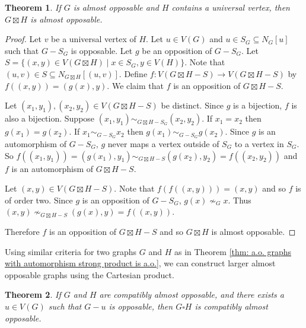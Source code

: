 \documentclass[11pt]{article}
\newtheorem{theorem}{Theorem}[section]
\theoremstyle{definition}
\begin{document}
\begin{theorem}
    \label{thm: a.o. strong product uni. vertex is a.o.}
    If $G$ is almost opposable and $H$ contains a universal vertex, then
    $G\boxtimes H$ is almost opposable. 
\end{theorem}

\begin{proof}
    Let $v$ be a universal vertex of $H$. Let $u\in V(G)$ and $u\in S_G
    \subseteq N_G[u]$ such that $G-S_G$ is opposable. Let $g$ be an opposition
    of $G-S_G$. Let $S = \{ (x,y)\in V(G\boxtimes H) \mid x\in S_G, y\in
    V(H)\}$. Note that $(u,v) \in S\subseteq N_{G\boxtimes H}[(u,v)]$. Define
    $f: V(G\boxtimes H - S) \to V(G\boxtimes H - S)$ by $f((x,y)) = (g(x), y)$.
    We claim that $f$ is an opposition of $G\boxtimes H - S$. 

    Let $(x_1, y_1), (x_2, y_2) \in V(G\boxtimes H - S)$ be distinct. Since $g$
    is a bijection, $f$ is also a bijection. Suppose $(x_1, y_1)
    \sim_{G\boxtimes H - S_G} (x_2, y_2)$. If $x_1 = x_2$ then $g(x_1) =
    g(x_2)$. If $x_1 \sim_{G - S_G} x_2$ then $g(x_1) \sim _{G - S_G} g(x_2)$.
    Since $g$ is an automorphism of $G- S_G$, $g$ never maps a vertex outside
    of $S_G$ to a vertex in $S_G$. So $f((x_1,y_1)) = (g(x_1), y_1)
    \sim_{G\boxtimes H - S} (g(x_2), y_2) = f((x_2, y_2))$ and $f$ is an
    automorphism of $G\boxtimes H - S$.

    Let $(x,y) \in V(G\boxtimes H - S)$. Note that $f(f((x,y))) = (x,y)$ and so
    $f$ is of order two. Since $g$ is an opposition of $G-S_G$, $g(x) \nsim_G
    x$. Thus $(x,y) \nsim_{G\boxtimes H - S} (g(x), y) = f((x,y))$. 

    Therefore $f$ is an opposition of $G\boxtimes H - S$ and so $G\boxtimes H$
    is almost opposable. 
\end{proof}

Using similar criteria for two graphs $G$ and $H$ as in Theorem \ref{thm: a.o.
graphs with automorphism strong product is a.o.}, we can construct larger
almost opposable graphs using the Cartesian product.

\begin{theorem}
    \label{thm: a.o. graphs with automorphism Cartesian product is a.o.}
    If $G$ and $H$ are compatibly almost opposable, and there exists a $u\in
    V(G)$ such that $G-u$ is opposable, then $G\square H$ is compatibly almost
    opposable.
\end{theorem}
\end{document}
